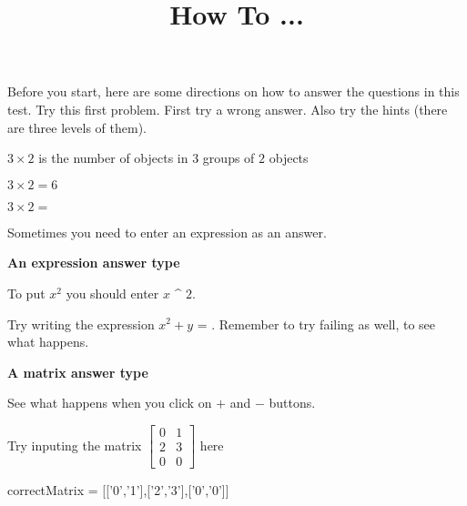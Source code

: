 \documentclass{ximera}
\title{How To ...}
\begin{document}
\maketitle
Before you start, here are some directions on how to answer the questions in this test. 
Try this first problem. First try a wrong answer. Also try the hints (there are three levels of them). 
\begin{question}
\begin{solution}
\begin{hint}
$3 \times 2$ is the number of objects in $3$ groups of $2$ objects
\end{hint}
\begin{hint}
\end{hint}
\begin{hint}
$3\times 2=6$
\end{hint}
$3\times 2 = $ 
\end{solution}
\end{question}

Sometimes you need to enter an expression as an answer. 
\begin{question}
\textbf{An expression answer type}
\begin{solution}
\begin{hint}
To put $x^2$ you should enter $x$ ^ $2$.
\end{hint}
Try writing the expression $x^2+y$ = . Remember to try failing as well, to see what happens.
\end{solution}
\end{question}

\begin{question}
\textbf{A matrix answer type}
\begin{solution}
\begin{hint}
See what happens when you click on $+$ and $-$ buttons.
\end{hint}
Try inputing the matrix $\begin{bmatrix} 0&1\\2&3\\0&0\end{bmatrix}$ here
\begin{matrix-answer}[name=M]
correctMatrix = [['0','1'],['2','3'],['0','0']]
\end{matrix-answer}
\end{solution}
\end{question}
\end{document}
